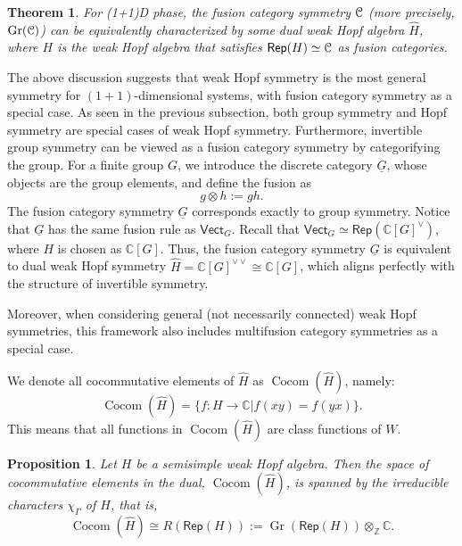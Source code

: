 \documentclass[a4paper,11pt]{article}
\theoremstyle{theorem}
\newtheorem{theorem}{Theorem}
\newtheorem{proposition}{Proposition}
\theoremstyle{remark}
\newcommand\eC           {\EuScript{C}}
\newcommand{\Zbb}{\mathbb{Z}}
\newcommand{\Cbb}{\mathbb{C}}
\newcommand{\Rep}{\mathsf{Rep}}
\newcommand{\Cocom}{\operatorname{Cocom}}
\newcommand{\Vect}{\mathsf{Vect}}
\begin{document}
\begin{theorem}
    For (1+1)D phase, the fusion category symmetry $\eC$ (more precisely, $\operatorname{Gr} (\eC)$) can be equivalently characterized by some dual weak Hopf algebra $\hat{H}$, where $H$ is the weak Hopf algebra that satisfies $\Rep(H)\simeq \eC$ as fusion categories.
\end{theorem}

The above discussion suggests that weak Hopf symmetry is the most general symmetry for \((1+1)\)-dimensional systems, with fusion category symmetry as a special case. As seen in the previous subsection, both group symmetry and Hopf symmetry are  special cases of weak Hopf symmetry. Furthermore, invertible group symmetry can be viewed as a fusion category symmetry by categorifying the group. For a finite group \( G \), we introduce the discrete category \( \underline{G} \), whose objects are the group elements, and define the fusion as
\begin{equation}
    g \otimes h := gh.
\end{equation}
The fusion category symmetry \( \underline{G} \) corresponds exactly to group symmetry. Notice that \( \underline{G} \) has the same fusion rule as \( \Vect_G \). Recall that \( \Vect_G \simeq \Rep({\Cbb[G]}^{\vee}) \), where \( H \) is chosen as \( \Cbb[G] \). Thus, the fusion category symmetry \( \underline{G} \) is equivalent to dual weak Hopf symmetry \( \hat{H} =\Cbb[G]^{\vee\vee}  \cong \Cbb[G] \), which aligns perfectly with the structure of invertible symmetry.


Moreover, when considering general (not necessarily connected) weak Hopf symmetries, this framework also includes multifusion category symmetries as a special case.


We denote all cocommutative elements of $\hat{H}$ as $\Cocom (\hat{H})$, namely:
\begin{equation}
   \Cocom (\hat{H})=\{f:H\to \Cbb| f(xy)=f(yx)\}.
\end{equation}
This means that all functions in $\Cocom (\hat{H})$ are class functions of $W$.

\begin{proposition} \label{prop:characterBasis}
Let $H$ be a semisimple weak Hopf algebra.  
Then the space of cocommutative elements in the dual, $\Cocom(\hat{H})$, is spanned by the irreducible characters $\chi_{\Gamma}$ of $H$, that is,
\[
\Cocom(\hat{H}) \cong R(\Rep(H)) := \operatorname{Gr}(\Rep(H)) \otimes_{\Zbb} \Cbb.
\]
\end{proposition}
\end{document}
